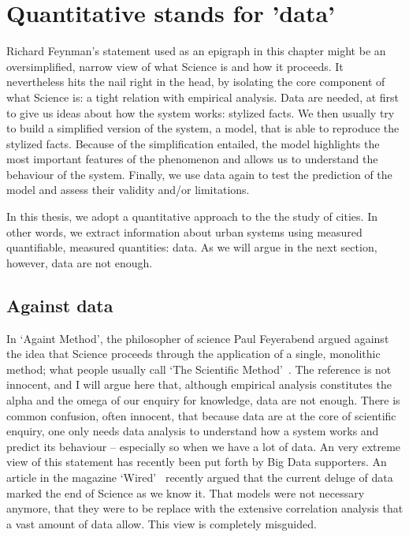 \section{Quantitative stands for 'data'}
\label{sec:quantitative_stands_for_data_}

Richard Feynman's statement used as an epigraph in this chapter might be an
oversimplified, narrow view of what Science is and how it proceeds. It
nevertheless hits the nail right in the head, by isolating the core component of
what Science is: a tight relation with empirical analysis. Data are needed, at
first to give us ideas about how the system works: stylized facts. We then
usually try to build a simplified version of the system, a model, that is able
to reproduce the stylized facts. Because of the simplification entailed, the
model highlights the most important features of the phenomenon and allows us to
understand the behaviour of the system. Finally, we use data again to test the
prediction of the model and assess their validity and/or limitations.

In this thesis, we adopt a quantitative approach to the the study of cities. In
other words, we extract information about urban systems using measured
quantifiable, measured quantities: data. As we will argue in the next section,
however, data are not enough.


\subsection{Against data}
\label{sec:against_data}

In `Againt Method', the philosopher of science Paul Feyerabend argued against
the idea that Science proceeds through the application of a single, monolithic
method; what people usually call `The Scientific Method'~\cite{Feyerabend:1975}.
The reference is not innocent, and I will argue here that, although empirical
analysis constitutes the alpha and the omega of our enquiry for knowledge, data
are not enough.
There is common confusion, often innocent, that because data are at the core of
scientific enquiry, one only needs data analysis to understand how a system
works and predict its behaviour -- especially so when we have a lot of data. An
very extreme view of this statement has recently been put forth by Big Data
supporters. An article in the magazine `Wired'~\cite{Anderson:2008} recently
argued that the current deluge of data marked the end of Science as we know it.
That models were not necessary anymore, that they were to be replace with the
extensive correlation analysis that a vast amount of data allow. This view is
completely misguided.\\


